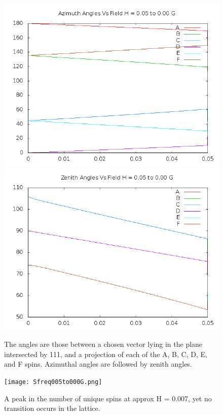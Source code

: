 \documentclass{article}
\begin{document}
\begin{figure}
\centering
\includegraphics[scale=0.5]{azim005to000.png}
\includegraphics[scale=0.5]{zen005to000.png}
\caption{The angles are those between a chosen vector lying in the plane intersected by 111,
and a projection of each of the A, B, C, D, E, and F spins. Azimuthal angles are followed by zenith angles.}
\end{figure}

\begin{center}
\vspace*{\fill}
\begin{figure}
\centering
 \texttt{[image: Sfreq005to000G.png]}
 \caption{A peak in the number of unique spins at approx H = 0.007, yet no transition occurs in the lattice.}
\end{figure}
\vspace*{\fill}
\end{center}
\end{document}
